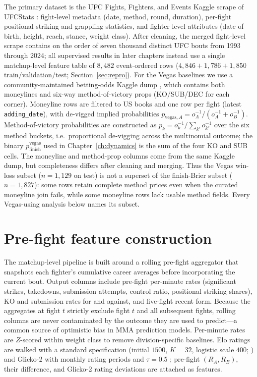 \documentclass[12pt,oneside]{report}
\begin{document}
The primary dataset is the UFC Fights, Fighters, and Events
Kaggle scrape of UFCStats \citep{ufcstats,ufckagglealibi}: fight-level
metadata (date, method, round, duration), per-fight positional
striking and grappling statistics, and fighter-level attributes
(date of birth, height, reach, stance, weight class).  After
cleaning, the merged fight-level scrape contains on the order
of seven thousand distinct UFC bouts from 1993 through 2024; all
supervised results in later chapters instead use a single
matchup-level feature table of $8{,}482$ event-ordered rows
($4{,}846{+}1{,}786{+}1{,}850$ train/validation/test;
Section~\ref{sec:repro}).  For the Vegas baselines we use a
community-maintained betting-odds Kaggle dump
\citep{ufcoddskaggle}, which contains both moneylines and
six-way method-of-victory props (KO/SUB/DEC for each corner).
Moneyline rows are filtered to US books and one row per fight
(latest \texttt{adding\_date}), with de-vigged implied probabilities
\(p_{\mathrm{vegas},A} = o_A^{-1} / (o_A^{-1} + o_B^{-1})\).
Method-of-victory probabilities are constructed as
$p_k = o_k^{-1}/\sum_{k'} o_{k'}^{-1}$ over the six method buckets,
i.e.\ proportional de-vigging across the multinomial outcome; the
binary \(p_{\mathrm{finish}}^{\mathrm{vegas}}\) used in
Chapter~\ref{ch:dynamics} is the sum of the four KO and SUB cells.
The moneyline and method-prop columns come from the same Kaggle dump, but completeness differs after cleaning and merging.  Thus the Vegas win-loss subset (\(n = 1{,}129\) on test) is not a superset of the finish-Brier subset (\(n = 1{,}827\)): some rows retain complete method prices even when the curated moneyline join fails, while some moneyline rows lack usable method fields.  Every Vegas-using analysis below names its subset.

\section{Pre-fight feature construction}

The matchup-level pipeline is built around a rolling pre-fight
aggregator that snapshots each fighter's cumulative career averages
before incorporating the current bout.  Output columns include
pre-fight per-minute rates (significant strikes, takedowns,
submission attempts, control ratio, positional striking shares), KO
and submission rates for and against, and five-fight recent form.
Because the aggregates at fight $t$ strictly exclude fight $t$ and
all subsequent fights, rolling columns are never contaminated by the
outcome they are used to predict---a common source of optimistic bias
in MMA prediction models.  Per-minute rates are
$Z$-scored within weight class to remove division-specific
baselines.  Elo ratings are walked with a standard specification
(initial $1500$, $K = 32$, logistic scale $400$;
\citealp{elo1978rating}) and Glicko-2 with monthly rating periods and
\(\tau = 0.5\) \citep{glickman2012example}; pre-fight $(R_A, R_B)$,
their difference, and Glicko-2 rating deviations are attached as
features.
\end{document}
